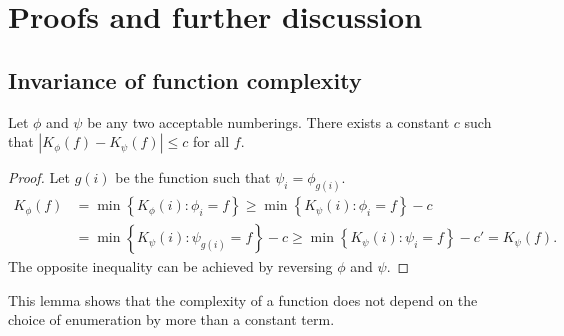 \documentclass{style/llncs}
\begin{document}



\appendix

\section{Proofs and further discussion}

\subsection{Invariance of function complexity}

\begin{lemma}
Let $\phi$ and $\psi$ be any two acceptable numberings. There exists a constant $c$ such that $\left| K_\phi(f) - K_\psi(f)\right | \leq c$ for all $f$. \label{lemma:invariance}
\end{lemma}
\begin{proof}
Let $g(i)$ be the function such that $\psi_i=\phi_{g(i)}$.
\begin{align*}
K_\phi(f) &= \min\left\{ K_\phi(i) : \phi_i= f\right\} 
\geq \min\left\{ K_\psi(i) : \phi_i= f\right\} - c\\
&= \min\left\{ K_\psi(i) : \psi_{g(i)}= f\right\} - c
\geq \min\left\{ K_\psi(i) : \psi_i= f\right\} - c' = K_\psi(f).
\end{align*}
The opposite inequality can be achieved by reversing $\phi$ and $\psi$. 
\end{proof}
This lemma shows that the complexity of a function does not depend on the choice of
enumeration by more than a constant term.
\end{document}
